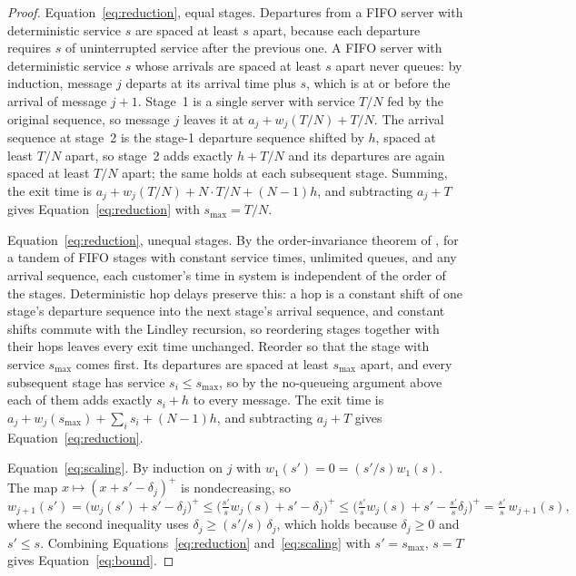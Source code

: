 \documentclass[11pt]{article}
\begin{document}
\begin{proof}
Equation~\eqref{eq:reduction}, equal stages. Departures from a FIFO server with
deterministic service $s$ are spaced at least $s$ apart, because each departure requires
$s$ of uninterrupted service after the previous one. A FIFO server with deterministic
service $s$ whose arrivals are spaced at least $s$ apart never queues: by induction,
message $j$ departs at its arrival time plus $s$, which is at or before the arrival of
message $j+1$. Stage~1 is a single server with service $T/N$ fed by the original sequence,
so message $j$ leaves it at $a_j + w_j(T/N) + T/N$. The arrival sequence at stage~2 is the
stage-1 departure sequence shifted by $h$, spaced at least $T/N$ apart, so stage~2 adds
exactly $h + T/N$ and its departures are again spaced at least $T/N$ apart; the same holds
at each subsequent stage. Summing, the exit time is $a_j + w_j(T/N) + N \cdot T/N +
(N-1)h$, and subtracting $a_j + T$ gives Equation~\eqref{eq:reduction} with $s_{\max} =
T/N$.

Equation~\eqref{eq:reduction}, unequal stages. By the order-invariance theorem of
\citet{friedman1965}, for a tandem of FIFO stages with constant service times, unlimited
queues, and any arrival sequence, each customer's time in system is independent of the
order of the stages. Deterministic hop delays preserve this: a hop is a constant shift of
one stage's departure sequence into the next stage's arrival sequence, and constant shifts
commute with the Lindley recursion, so reordering stages together with their hops leaves
every exit time unchanged. Reorder so that the stage with service $s_{\max}$ comes first.
Its departures are spaced at least $s_{\max}$ apart, and every subsequent stage has
service $s_i \le s_{\max}$, so by the no-queueing argument above each of them adds exactly
$s_i + h$ to every message. The exit time is $a_j + w_j(s_{\max}) + \sum_i s_i + (N-1)h$,
and subtracting $a_j + T$ gives Equation~\eqref{eq:reduction}.

Equation~\eqref{eq:scaling}. By induction on $j$ with $w_1(s') = 0 = (s'/s) w_1(s)$. The
map $x \mapsto (x + s' - \delta_j)^+$ is nondecreasing, so
\[
w_{j+1}(s') = \big(w_j(s') + s' - \delta_j\big)^+ \le \Big(\tfrac{s'}{s} w_j(s) + s' -
\delta_j\Big)^+ \le \Big(\tfrac{s'}{s} w_j(s) + s' - \tfrac{s'}{s}\delta_j\Big)^+ =
\tfrac{s'}{s}\, w_{j+1}(s),
\]
where the second inequality uses $\delta_j \ge (s'/s)\,\delta_j$, which holds because
$\delta_j \ge 0$ and $s' \le s$. Combining Equations~\eqref{eq:reduction}
and~\eqref{eq:scaling} with $s' = s_{\max}$, $s = T$ gives Equation~\eqref{eq:bound}.
\end{proof}
\end{document}
